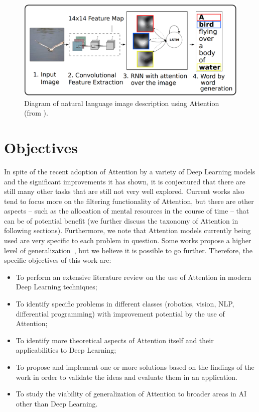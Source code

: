 \documentclass[English]{style/ic-tese-v3}
\begin{document}
\begin{figure}
\begin{center}
	\includegraphics[width=1.0\linewidth]{./img/img_captioning.png}
\caption{
    Diagram of natural language image description using Attention
    (from \cite{ref:img-captioning}).
}
\label{fig:description}
\end{center}
\end{figure}

\section{Objectives}
In spite of the recent adoption of Attention by a variety of Deep Learning models
and the significant improvements it has shown, it is conjectured that there are still many other tasks
that are still not very well explored.
Current works also tend to focus more on the filtering functionality of Attention,
but there are other aspects
-- such as the allocation of mental resources in the course of time -- that can be of potential benefit
(we further discuss the taxonomy of Attention in following sections).
Furthermore, we note that Attention models currently being used
are very specific to each problem in question.
Some works propose a higher level of generalization~\cite{ref:recurr-models},
but we believe it is possible to go further.
Therefore, the specific objectives of this work are:
\begin{itemize}
    \item To perform an extensive literature review on the use of Attention
        in modern Deep Learning techniques;
    \item To identify specific problems in different classes
        (robotics, vision, NLP, differential programming) with
        improvement potential by the use of Attention;
    \item To identify more theoretical aspects of Attention itself and their applicabilities to Deep Learning;
    \item To propose and implement one or more solutions based on the findings of the work in order to
        validate the ideas and evaluate them in an application.
    \item To study the viability of generalization of Attention
        to broader areas in AI other than Deep Learning.
\end{itemize}
\end{document}
